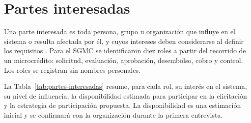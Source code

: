 
\section{Partes interesadas}
\label{sec:partes-interesadas}

Una parte interesada es toda persona, grupo u organización que influye en el sistema o resulta afectada por él, y cuyos intereses deben considerarse al definir los requisitos \cite{iso29148}. Para el SGMC se identificaron diez roles a partir del recorrido de un microcrédito: solicitud, evaluación, aprobación, desembolso, cobro y control. Los roles se registran sin nombres personales.

La Tabla~\ref{tab:partes-interesadas} resume, para cada rol, su interés en el sistema, su nivel de influencia, la disponibilidad estimada para participar en la elicitación y la estrategia de participación propuesta. La disponibilidad es una estimación inicial y se confirmará con la organización durante la primera entrevista.


